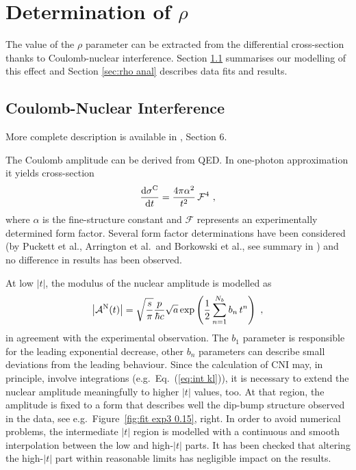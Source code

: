 \section{Determination of $\rho$}
\label{sec:rho}

The value of the $\rho$ parameter can be extracted from the differential cross-section thanks to Coulomb-nuclear interference. Section \ref{sec:rho cni} summarises our modelling of this effect and Section \ref{sec:rho anal} describes data fits and results.

\subsection{Coulomb-Nuclear Interference}
\label{sec:rho cni}

 More complete description is available in \cite{totem-8tev-1km}, Section 6.

The Coulomb amplitude can be derived from QED. In one-photon approximation it yields cross-section
\begin{equation}
\label{eq:coul cs}
	{{\rm d}\sigma^{\rm C}\over {\rm d}t} = {4\pi\alpha^2\over t^2}\,{\mathcal{F}}^4\ ,
\end{equation}
where $\alpha$ is the fine-structure constant and $\mathcal{F}$ represents an experimentally determined form factor. Several form factor determinations have been considered (by Puckett et al., Arrington et al.~and Borkowski et al., see summary in \cite{elegent}) and no difference in results has been observed.

At low $|t|$, the modulus of the nuclear amplitude is modelled as
\begin{equation}
\label{eq:nuc mod}
\left | {\cal A}^{\rm N}(t) \right | = \sqrt{s\over\pi} {p\over \hbar c} \sqrt{a} \exp\left( {1\over 2} \sum\limits_{n = 1}^{N_b} b_n\, t^n \right)\ ,
\end{equation}
in agreement with the experimental observation. The $b_1$ parameter is responsible for the leading exponential decrease, other $b_n$ parameters can describe small deviations from the leading behaviour. Since the calculation of CNI may, in principle, involve integrations (e.g.~Eq.~(\ref{eq:int kl})), it is necessary to extend the nuclear amplitude meaningfully to higher $|t|$ values, too. At that region, the amplitude is fixed to a form that describes well the dip-bump structure observed in the data, see e.g.~Figure~\ref{fig:fit exp3 0.15}, right. In order to avoid numerical problems, the intermediate $|t|$ region is modelled with a continuous and smooth interpolation between the low and high-$|t|$ parts. It has been checked that altering the high-$|t|$ part within reasonable limits has negligible impact on the results.

